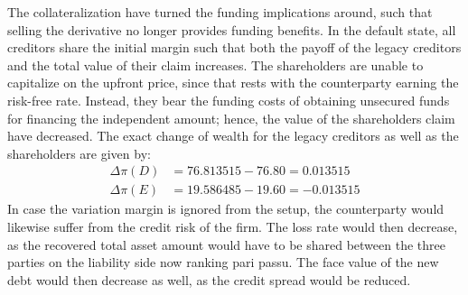 \documentclass[../main.tex]{subfiles}
\begin{document}
        The collateralization have turned the funding implications around,
        such that selling the derivative no longer provides funding benefits.
        In the default state, all creditors share the initial margin 
        such that both the payoff of the legacy creditors and the total value of their claim increases.
        The shareholders are unable to capitalize on the upfront price,
        since that rests with the counterparty earning the risk-free rate.
        Instead, they bear the funding costs of obtaining unsecured funds 
        for financing the independent amount;
        hence, the value of the shareholders claim have decreased.
        The exact change of wealth for the legacy creditors as well as the shareholders are given by:
        \begin{align}
            \Delta \pi(D) &= \num{76.813515} - \num{76.80} = \num{0.013515}\\
            \Delta \pi(E) &= \num{19.586485} - \num{19.60} = \num{-0.013515}
        \end{align}
        In case the variation margin is ignored from the setup, the counterparty would likewise suffer from the credit risk of the firm.
        The loss rate would then decrease,
        as the recovered total asset amount would have to be shared between the three parties on the liability side now ranking pari passu.
        The face value of the new debt would then decrease as well, as the credit spread would be reduced.
\end{document}
